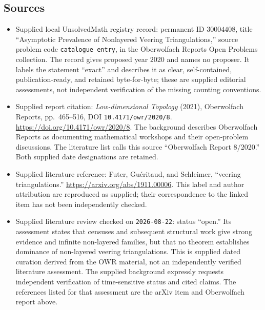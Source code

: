 \documentclass[11pt]{article}
\begin{document}
\subsection{Sources}
\begin{itemize}
\item Supplied local UnsolvedMath registry record: permanent ID \(30004408\), title ``Asymptotic Prevalence of Nonlayered Veering Triangulations,'' source problem code \texttt{catalogue entry}, in the Oberwolfach Reports Open Problems collection. The record gives proposed year \(2020\) and names no proposer. It labels the statement ``exact'' and describes it as clear, self-contained, publication-ready, and retained byte-for-byte; these are supplied editorial assessments, not independent verification of the missing counting conventions.
\item Supplied report citation: \emph{Low-dimensional Topology} (2021), Oberwolfach Reports, pp.\ 465--516, DOI \texttt{10.4171/owr/2020/8}. \url{https://doi.org/10.4171/owr/2020/8}. The background describes Oberwolfach Reports as documenting mathematical workshops and their open-problem discussions. The literature list calls this source ``Oberwolfach Report 8/2020.'' Both supplied date designations are retained.
\item Supplied literature reference: Futer, Gu\'{e}ritaud, and Schleimer, ``veering triangulations.'' \url{https://arxiv.org/abs/1911.00006}. This label and author attribution are reproduced as supplied; their correspondence to the linked item has not been independently checked.
\item Supplied literature review checked on \texttt{2026-08-22}: status ``open.'' Its assessment states that censuses and subsequent structural work give strong evidence and infinite non-layered families, but that no theorem establishes dominance of non-layered veering triangulations. This is supplied dated curation derived from the OWR material, not an independently verified literature assessment. The supplied background expressly requests independent verification of time-sensitive status and cited claims. The references listed for that assessment are the arXiv item and Oberwolfach report above.
\end{itemize}
\end{document}
